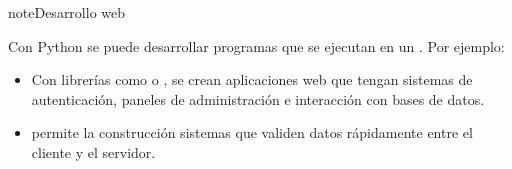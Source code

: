 \documentclass[letterpaper,10pt,spanish]{sphinxmanual}
\begin{document}
\begin{sphinxadmonition}{note}{Desarrollo web}

\sphinxAtStartPar
Con Python se puede desarrollar programas que se ejecutan en un . Por ejemplo:
\begin{itemize}
\item {} 
\sphinxAtStartPar
Con librerías como  o , se crean aplicaciones web que tengan sistemas de autenticación, paneles de administración e interacción con bases de datos.

\item {} 
\sphinxAtStartPar
{} permite la construcción sistemas que validen datos rápidamente entre el cliente y el servidor.

\end{itemize}


\end{sphinxadmonition}
\end{document}
